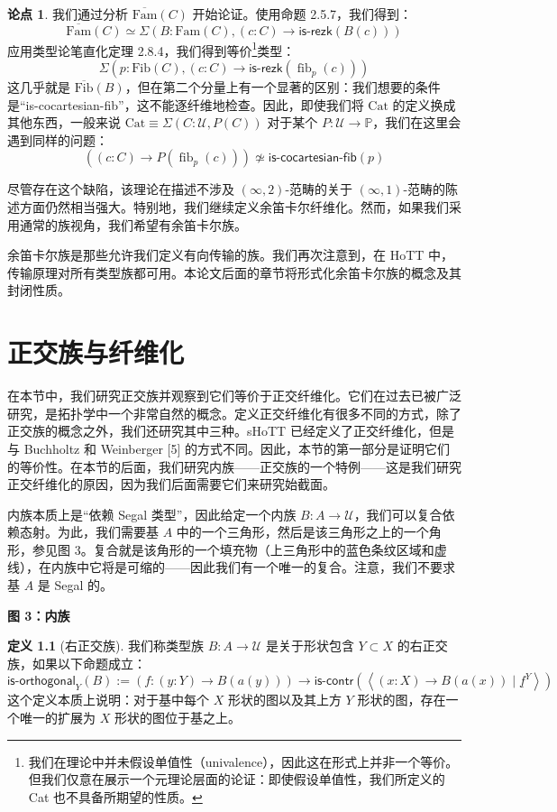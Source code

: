 \documentclass{ctexrep}
\theoremstyle{plain}
\theoremstyle{definition}
\newtheorem{definition}[theorem]{定义}
\theoremstyle{remark}
\theoremstyle{definition}
\theoremstyle{definition}
\theoremstyle{definition}
\newtheorem{argument}[theorem]{论点}
\newcommand{\coloneqq}{\mathrel{:=}}
\newcommand{\fib}{\operatorname{fib}}
\newcommand{\iscontr}{\mathsf{is\text{-}contr}}
\newcommand{\UU}{\mathcal{U}}
\newcommand{\Cat}{\mathrm{Cat}}
\newcommand{\Fam}{\mathrm{Fam}}
\newcommand{\Fib}{\mathrm{Fib}}
\newcommand{\isrezk}{\mathsf{is\text{-}rezk}}
\newcommand{\isorthogonal}{\mathsf{is\text{-}orthogonal}}
\begin{document}
\begin{argument}
我们通过分析 $\overline{\Fam}(C)$ 开始论证。使用命题 2.5.7，我们得到：
\[
\overline{\Fam}(C) \simeq \Sigma (B:\Fam(C), (c:C) \to \isrezk(B(c)))
\]
应用类型论笔直化定理 2.8.4，我们得到等价\footnote{我们在理论中并未假设单值性（univalence），因此这在形式上并非一个等价。但我们仅意在展示一个元理论层面的论证：即使假设单值性，我们所定义的 Cat 也不具备所期望的性质。}类型：
\[
\Sigma (p:\Fib(C), (c:C) \to \isrezk(\fib_p(c)))
\]
这几乎就是 $\overline{\Fib}(B)$，但在第二个分量上有一个显著的区别：我们想要的条件是“is-cocartesian-fib”，这不能逐纤维地检查。因此，即使我们将 $\Cat$ 的定义换成其他东西，一般来说 $\Cat \equiv \Sigma(C:\UU, P(C))$ 对于某个 $P:\UU \to \mathbb{P}$，我们在这里会遇到同样的问题：
\[
\left((c:C) \to P(\fib_p(c))\right) \not\simeq \mathsf{is\text{-}cocartesian\text{-}fib}(p)
\]
\end{argument}
尽管存在这个缺陷，该理论在描述不涉及 $(\infty,2)$-范畴的关于 $(\infty,1)$-范畴的陈述方面仍然相当强大。特别地，我们继续定义余笛卡尔纤维化。然而，如果我们采用通常的族视角，我们希望有余笛卡尔族。

余笛卡尔族是那些允许我们定义有向传输的族。我们再次注意到，在 HoTT 中，传输原理对所有类型族都可用。本论文后面的章节将形式化余笛卡尔族的概念及其封闭性质。

\chapter{正交族与纤维化}

在本节中，我们研究正交族并观察到它们等价于正交纤维化。它们在过去已被广泛研究，是拓扑学中一个非常自然的概念。定义正交纤维化有很多不同的方式，除了正交族的概念之外，我们还研究其中三种。sHoTT 已经定义了正交纤维化，但是与 Buchholtz 和 Weinberger [5] 的方式不同。因此，本节的第一部分是证明它们的等价性。在本节的后面，我们研究内族——正交族的一个特例——这是我们研究正交纤维化的原因，因为我们后面需要它们来研究始截面。

内族本质上是“依赖 Segal 类型”，因此给定一个内族 $B:A\to\UU$，我们可以复合依赖态射。为此，我们需要基 $A$ 中的一个三角形，然后是该三角形之上的一个角形，参见图 3。复合就是该角形的一个填充物（上三角形中的蓝色条纹区域和虚线），在内族中它将是可缩的——因此我们有一个唯一的复合。注意，我们不要求基 $A$ 是 Segal 的。

\begin{center}
\textbf{图 3：内族}
\end{center}

\begin{definition}[右正交族]
我们称类型族 $B:A\to\UU$ 是关于形状包含 $Y\subset X$ 的右正交族，如果以下命题成立：
\[
\isorthogonal_Y(B) \coloneqq \left(f:(y:Y)\to B(a(y))\right) \to \iscontr\left( \left\langle (x:X)\to B(a(x)) \mid \underline{f}^{Y} \right\rangle \right)
\]
这个定义本质上说明：对于基中每个 $X$ 形状的图以及其上方 $Y$ 形状的图，存在一个唯一的扩展为 $X$ 形状的图位于基之上。
\end{definition}
\end{document}
